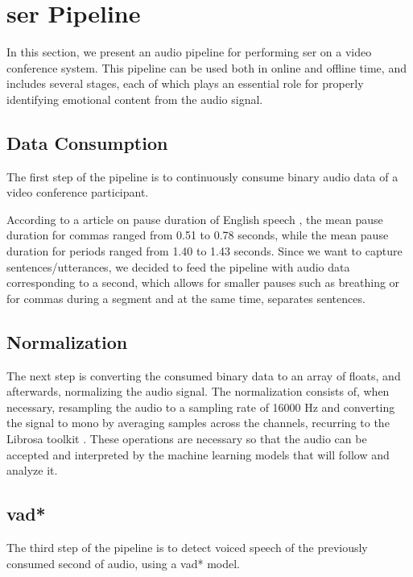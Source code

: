 \chapter{\acl{ser} Pipeline}
\label{chapter:ser_conf}

In this section, we present an audio pipeline for performing \ac{ser} on a video conference system. This pipeline can be used both in online and offline time, and includes several stages, each of which plays an essential role for properly identifying emotional content from the audio signal.

\section{Data Consumption}

The first step of the pipeline is to continuously consume binary audio data of a video conference participant.

According to a \citeyear{Liu2022} article on pause duration of English speech \cite{Liu2022}, the mean pause duration for commas ranged from 0.51 to 0.78 seconds, while the mean pause duration for periods ranged from 1.40 to 1.43 seconds. Since we want to capture sentences/utterances, we decided to feed the pipeline with audio data corresponding to a second, which allows for smaller pauses such as breathing or for commas during a segment and at the same time, separates sentences.

\section{Normalization}

The next step is converting the consumed binary data to an array of floats, and afterwards, normalizing the audio signal. The normalization consists of, when necessary, resampling the audio to a sampling rate of 16000 Hz and converting the signal to mono by averaging samples across the channels, recurring to the Librosa toolkit \cite{Librosa}. These operations are necessary so that the audio can be accepted and interpreted by the machine learning models that will follow and analyze it.

\section{\acl{vad*}}

The third step of the pipeline is to detect voiced speech of the previously consumed second of audio, using a \ac{vad*} model.

